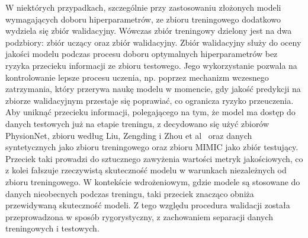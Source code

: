 \documentclass[a4paper,twoside,12pt]{book}
\begin{document}
W niektórych przypadkach, szczególnie przy zastosowaniu złożonych modeli wymagających doboru hiperparametrów, ze zbioru treningowego dodatkowo wydziela się zbiór walidacyjny. Wówczas zbiór treningowy dzielony jest na dwa podzbiory: zbiór uczący oraz zbiór walidacyjny. Zbiór walidacyjny służy do oceny jakości modelu podczas procesu doboru optymalnych hiperparametrów bez ryzyka przecieku informacji ze zbioru testowego. Jego wykorzystanie pozwala na kontrolowanie lepsze procesu uczenia, np. poprzez mechanizm wczesnego zatrzymania, który przerywa naukę modelu w momencie, gdy jakość predykcji na zbiorze walidacyjnym przestaje się poprawiać, co ogranicza ryzyko przeuczenia.\\

Aby uniknąć przecieku informacji, polegającego na tym, że model ma dostęp do danych testowych już na etapie treningu, z decydowano się użyć zbiorów PhysionNet, zbioru według Liu, Zengding i Zhou et al~\cite{liu2022multiclass} oraz danych syntetycznych jako zbioru treningowego oraz zbioru MIMIC jako zbiór testujący. Przeciek taki prowadzi do sztucznego zawyżenia wartości metryk jakościowych, co z kolei fałszuje rzeczywistą skuteczność modelu w warunkach niezależnych od zbioru treningowego. W kontekście wdrożeniowym, gdzie modele są stosowane do danych nieobecnych podczas treningu, taki przeciek znacząco obniża przewidywaną skuteczność modeli. Z tego względu procedura walidacji została przeprowadzona w sposób rygorystyczny, z zachowaniem separacji danych treningowych i testowych.
\end{document}
